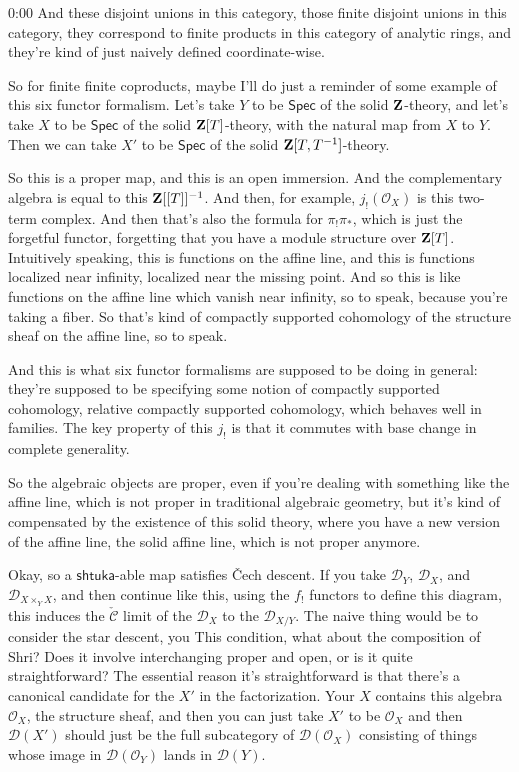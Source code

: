 \begin{unfinished}{0:00}
And these disjoint unions in this category, those finite disjoint unions in this category, they correspond to finite products in this category of analytic rings, and they're kind of just naively defined coordinate-wise.

So for finite finite coproducts, maybe I'll do just a reminder of some example of this six functor formalism. Let's take $Y$ to be $\mathsf{Spec}$ of the solid $\mathbf Z$-theory, and let's take $X$ to be $\mathsf{Spec}$ of the solid $\mathbf Z[T]$-theory, with the natural map from $X$ to $Y$. Then we can take $X'$ to be $\mathsf{Spec}$ of the solid $\mathbf Z[T, T^{-1}]$-theory. 

So this is a proper map, and this is an open immersion. And the complementary algebra is equal to this $\mathbf Z[[T]]^{-1}$. And then, for example, $j_! (\mathcal{O}_X)$ is this two-term complex. And then that's also the formula for $\pi_! \pi_*$, which is just the forgetful functor, forgetting that you have a module structure over $\mathbf Z[T]$. Intuitively speaking, this is functions on the affine line, and this is functions localized near infinity, localized near the missing point. And so this is like functions on the affine line which vanish near infinity, so to speak, because you're taking a fiber. So that's kind of compactly supported cohomology of the structure sheaf on the affine line, so to speak.

And this is what six functor formalisms are supposed to be doing in general: they're supposed to be specifying some notion of compactly supported cohomology, relative compactly supported cohomology, which behaves well in families. The key property of this $j_!$ is that it commutes with base change in complete generality.

So the algebraic objects are proper, even if you're dealing with something like the affine line, which is not proper in traditional algebraic geometry, but it's kind of compensated by the existence of this solid theory, where you have a new version of the affine line, the solid affine line, which is not proper anymore.

Okay, so a $\mathsf{shtuka}$-able map satisfies Čech descent. If you take $\mathcal{D}_Y$, $\mathcal{D}_X$, and $\mathcal{D}_{X \times_Y X}$, and then continue like this, using the $f_!$ functors to define this diagram, this induces the $\check{\mathcal{C}}$ limit of the $\mathcal{D}_X$ to the $\mathcal{D}_{X/Y}$. The naive thing would be to consider the star descent, you
This condition, what about the composition of Shri? Does it involve interchanging proper and open, or is it quite straightforward? The essential reason it's straightforward is that there's a canonical candidate for the $X'$ in the factorization. Your $X$ contains this algebra $\mathcal{O}_X$, the structure sheaf, and then you can just take $X'$ to be $\mathcal{O}_X$ and then $\mathcal{D}(X')$ should just be the full subcategory of $\mathcal{D}(\mathcal{O}_X)$ consisting of things whose image in $\mathcal{D}(\mathcal{O}_Y)$ lands in $\mathcal{D}(Y)$. 


\end{unfinished}
